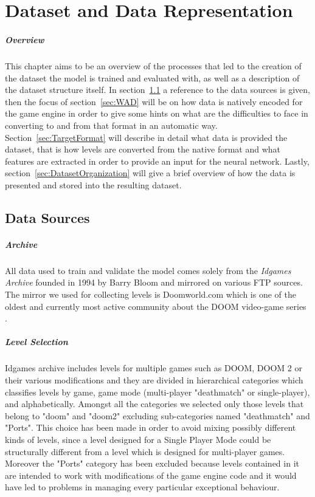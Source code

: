 \chapter{Dataset and Data Representation}
\paragraph{Overview}
This chapter aims to be an overview of the processes that led to the creation of the dataset the model is trained and evaluated with, as well as a description of the dataset structure itself.
In section~\ref{sec:Sources} a reference to the data sources is given, then the focus of section~\ref{sec:WAD} will be on how data is natively encoded for the game engine in order to give some hints on what are the difficulties to face in converting to and from that format in an automatic way. Section~\ref{sec:TargetFormat} will describe in detail what data is provided  the dataset, that is how levels are converted from the native format and what features are extracted in order to provide an input for the neural network. Lastly, section~\ref{sec:DatasetOrganization} will give a brief overview of how the data is presented and stored into the resulting dataset.
 
\section{Data Sources}
\label{sec:Sources}
\paragraph{Archive} All data used to train and validate the model comes solely from the \textit{Idgames Archive} founded in 1994 by Barry Bloom \cite{idarchive_history} and mirrored on various FTP sources. The mirror we used for collecting levels is Doomworld.com \cite{url:doomworld} which is one of the oldest and currently most active community about the DOOM video-game series \cite{wiki:doomworld}.
\paragraph{Level Selection} Idgames archive includes levels for multiple games such as DOOM, DOOM 2 or their various modifications and they are divided in hierarchical categories which classifies levels by game, game mode (multi-player "deathmatch" or single-player), and alphabetically.
Amongst all the categories we selected only those levels that belong to "doom" and "doom2" excluding sub-categories named "deathmatch" and "Ports". This choice has been made in order to avoid mixing possibly different kinds of levels, since a level designed for a Single Player Mode could be structurally different from a level which is designed for multi-player games. Moreover the "Ports" category has been excluded because levels contained in it are intended to work with modifications of the game engine code and it would have led to problems in managing every particular exceptional behaviour.

